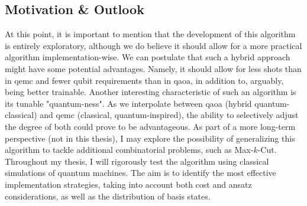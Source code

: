 \subsection{Motivation \& Outlook}
\label{subsection:iQAQE Motivation}
At this point, it is important to mention that the development of this algorithm is entirely exploratory, although we do believe it should allow for a more practical algorithm implementation-wise. We can postulate that such a hybrid approach might have some potential advantages. Namely, it should allow for less shots than in \acrshort{qemc} and fewer qubit requirements than in \acrshort{qaoa}, in addition to, arguably, being better trainable. Another interesting characteristic of such an algorithm is its tunable "quantum-ness". As we interpolate between \acrshort{qaoa} (hybrid quantum-classical) and \acrshort{qemc} (classical, quantum-inspired), the ability to selectively adjust the degree of both could prove to be advantageous. As part of a more long-term perspective (not in this thesis), I may explore the possibility of generalizing this algorithm to tackle additional combinatorial problems, such as Max-$k$-Cut. Throughout my thesis, I will rigorously test the algorithm using classical simulations of quantum machines. The aim is to identify the most effective implementation strategies, taking into account both cost and ansatz considerations, as well as the distribution of basis states.

